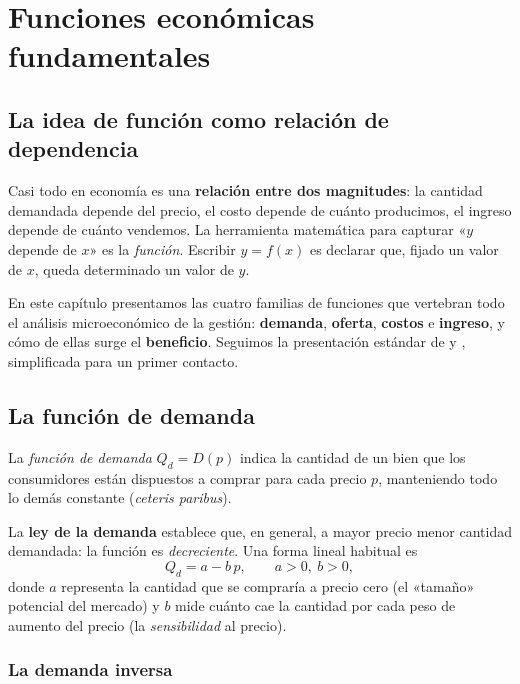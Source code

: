\chapter{Funciones económicas fundamentales}
\label{cap:funciones}

\section{La idea de función como relación de dependencia}

Casi todo en economía es una \textbf{relación entre dos magnitudes}: la cantidad demandada depende del precio, el costo depende de cuánto producimos, el ingreso depende de cuánto vendemos. La herramienta matemática para capturar «$y$ depende de $x$» es la \emph{función}. Escribir $y = f(x)$ es declarar que, fijado un valor de $x$, queda determinado un valor de $y$.

En este capítulo presentamos las cuatro familias de funciones que vertebran todo el análisis microeconómico de la gestión: \textbf{demanda}, \textbf{oferta}, \textbf{costos} e \textbf{ingreso}, y cómo de ellas surge el \textbf{beneficio}. Seguimos la presentación estándar de \cite{varian} y \cite{pindyck}, simplificada para un primer contacto.

\section{La función de demanda}

\begin{definicion}
La \emph{función de demanda} $Q_d = D(p)$ indica la cantidad de un bien que los consumidores están dispuestos a comprar para cada precio $p$, manteniendo todo lo demás constante (\emph{ceteris paribus}).
\end{definicion}

La \textbf{ley de la demanda} establece que, en general, a mayor precio menor cantidad demandada: la función es \emph{decreciente}. Una forma lineal habitual es
\begin{equation}
Q_d = a - b\,p, \qquad a>0,\ b>0,
\label{eq:demanda}
\end{equation}
donde $a$ representa la cantidad que se compraría a precio cero (el «tamaño» potencial del mercado) y $b$ mide cuánto cae la cantidad por cada peso de aumento del precio (la \emph{sensibilidad} al precio).

\subsection*{La demanda inversa}

